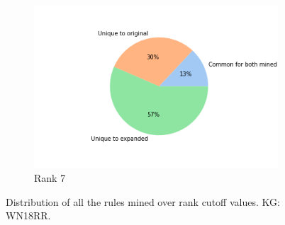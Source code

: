 \begin{figure}[h]
\begin{subfigure}[b]{0.49\textwidth}
            \centering 
            \includegraphics[width=\textwidth]{figures/results/ranks/pie_charts/('rank_cutoff', 7)_wn18rr.png}
            \caption[]%
            {{\small Rank 7}}    
            \label{fig:rank_7_pie_wn18rr}
        \end{subfigure}
        \hfill
        \caption[ ]
        {\small Distribution of all the rules mined over rank cutoff values. KG: WN18RR.} 
        \label{fig:rank_pies_wn18rr}
    \end{figure}